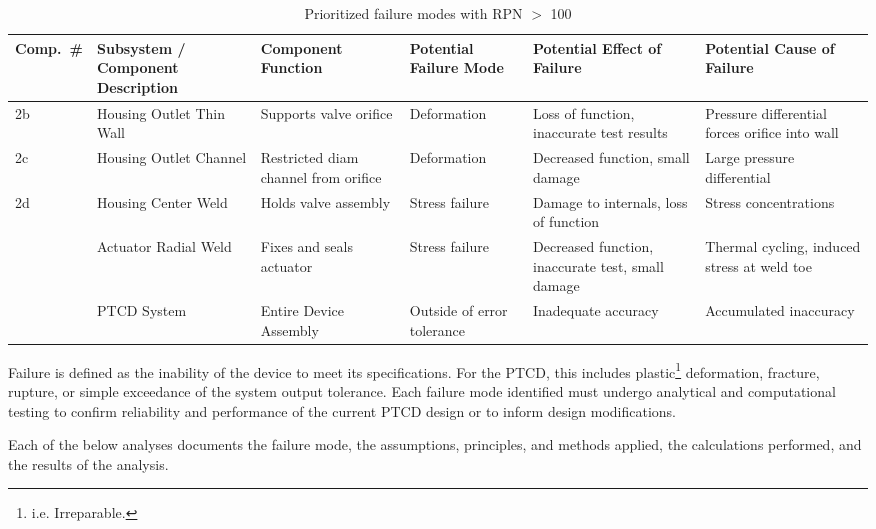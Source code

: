 \documentclass[12pt, letterpaper]{report}%
\newcommand{\device}{PTCD}
\begin{document}
		\vspace{1em}
		\begin{table}[h]
			\centering
			\caption{Prioritized failure modes with RPN $>$ 100}
			\label{tab:RPN_priority}
			\footnotesize
			\renewcommand{\arraystretch}{1.3}
			\begin{tabularx}{\textwidth}{
				>{\centering\arraybackslash}p{1.0cm}
				>{\raggedright\arraybackslash}p{2.4cm}
				>{\raggedright\arraybackslash}p{2.2cm}
				>{\raggedright\arraybackslash}p{2.0cm}
				>{\raggedright\arraybackslash}p{3.5cm}
				>{\raggedright\arraybackslash}X}
				\toprule
				\textbf{Comp.\ \#} & \textbf{Subsystem / Component Description} & \textbf{Component Function} & \textbf{Potential Failure Mode} & \textbf{Potential Effect of Failure} & \textbf{Potential Cause of Failure} \\
				\midrule
				2b & Housing Outlet Thin Wall & Supports valve orifice & Deformation & Loss of function, inaccurate test results & Pressure differential forces orifice into wall \\[4pt]
				2c & Housing Outlet Channel & Restricted diam channel from orifice & Deformation & Decreased function, small damage & Large pressure differential \\[4pt]
				2d & Housing Center Weld & Holds valve assembly & Stress failure & Damage to internals, loss of function & Stress concentrations \\[4pt]
				4  & Actuator Radial Weld & Fixes and seals actuator & Stress failure & Decreased function, inaccurate test, small damage & Thermal cycling, induced stress at weld toe \\[4pt]
				10 & PTCD System & Entire Device Assembly & Outside of error tolerance & Inadequate accuracy & Accumulated inaccuracy \\
				\bottomrule
			\end{tabularx}
		\end{table}

		Failure is defined as the inability of the device to meet its specifications.
		For the \device, this includes plastic\footnote{i.e. Irreparable.} deformation, fracture, rupture, or simple exceedance of the system output tolerance.
		Each failure mode identified must undergo analytical and computational testing to confirm reliability and performance of the current PTCD design
		or to inform design modifications.

		Each of the below analyses documents the failure mode, the assumptions, principles, and methods applied, the calculations performed, and the results of the analysis.
\end{document}
